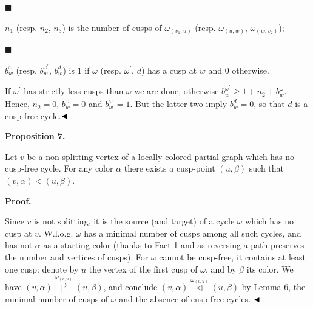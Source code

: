 \par\noindent  $\blacksquare$ 
 
$n_{1}$ (resp. $n_{2}$, $n_{3}$) is the number of cusps of ${\omega}_{(v_{1},u)}$ (resp. ${\omega}_{(u,w)}$, ${\omega}_{(w,v_{2})}$);\par
 
 
 
\par\noindent  $\blacksquare$ 
 
$b^{\omega}_{w}$ (resp. $b^{\omega^{\prime}}_{w}$, $b^{d}_{w}$) is $1$ if $\omega$ (resp. $\omega^{\prime}$, $d$) has a cusp at $w$ and $0$ otherwise.\par
 
 
  
If $\omega^{\prime}$ has strictly less cusps than $\omega$ we are done, otherwise $b^{\omega^{\prime}}_{w}\geq 1+n_{2}+b^{\omega}_{w}$. Hence, $n_{2}=0$, $b^{\omega}_{w}=0$ and $b^{\omega^{\prime}}_{w}=1$. But the latter two imply $b^{d}_{w}=0$, so that $d$ is a cusp-free cycle.$\hfill\blacktriangleleft$\par
 
 
 
\par\medskip\noindent\textbf{Proposition 7.}\par
 
 
Let $v$ be a non-splitting vertex of a locally colored partial graph which has no cusp-free cycle. For any color $\alpha$ there exists a cusp-point $(u,\beta)$ such that $(v,\alpha)\lhd(u,\beta)$.\par
 
 
 
 
 
\par\medskip\noindent\textbf{Proof.}\par
 
 
Since $v$ is not splitting, it is the source (and target) of a cycle $\omega$ which has no cusp at $v$. W.l.o.g. $\omega$ has a minimal number of cusps among all such cycles, and has not $\alpha$ as a starting color (thanks to Fact 1 and as reversing a path preserves the number and vertices of cusps). For $\omega$ cannot be cusp-free, it contains at least one cusp: denote by $u$ the vertex of the first cusp of $\omega$, and by $\beta$ its color. We have $(v,\alpha)\overset{{\omega}_{(v,u)}}{\Rsh}(u,\beta)$, and conclude $(v,\alpha)\overset{{\omega}_{(v,u)}}{\lhd}(u,\beta)$ by Lemma 6, the minimal number of cusps of $\omega$ and the absence of cusp-free cycles. $\hfill\blacktriangleleft$\par
 
